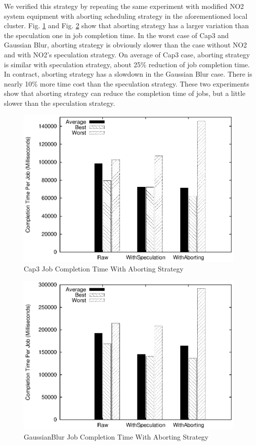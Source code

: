 We verified this strategy by repeating the same experiment with modified NO2 system equipment with aborting scheduling strategy in the aforementioned local cluster. Fig. \ref{figure:abort_completiontime_cap3} and Fig. \ref{figure:abort_completiontime_gaussianblur} show that aborting strategy has a larger variation than the speculation one in job completion time. In the worst case of Cap3 and Gaussian Blur, aborting strategy is obviously slower than the case without NO2 and with NO2's speculation strategy. On average of Cap3 case, aborting strategy is similar with speculation strategy, about 25\% reduction of job completion time. In contract, aborting strategy has a slowdown in the Gaussian Blur case. There is nearly 10\% more time cost than the speculation strategy. These two experiments show that aborting strategy can reduce the completion time of jobs, but a little slower than the speculation strategy.

\begin{figure}
\centering
\includegraphics[width=0.9\columnwidth]{figures/abort_completiontime_cap3.eps}
\caption{Cap3 Job Completion Time With Aborting Strategy}
\label{figure:abort_completiontime_cap3}
\end{figure}

\begin{figure}
\centering
\includegraphics[width=0.9\columnwidth]{figures/abort_completiontime_gaussianblur.eps}
\caption{GaussianBlur Job Completion Time With Aborting Strategy}
\label{figure:abort_completiontime_gaussianblur}
\end{figure}

